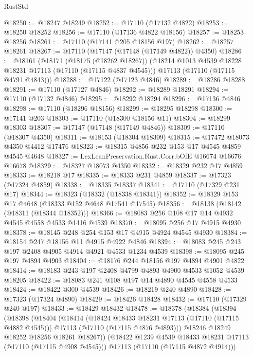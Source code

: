 \begin{lexlean}{RustStd}
\begin{coremodule}
@18250 := @18247 @18249
@18252 := @17110 (@17132 @4822)
@18253 := @18250 @18252
@18256 := @17110 (@17136 @4822 @18156)
@18257 := @18253 @18256
@18261 := @17110 (@17141 @205 @18156 @197)
@18262 := @18257 @18261
@18267 := @17110 (@17147 (@17148 (@17149 @4822)) @4350)
@18286 := @18161
    (@18171
      (@18175 (@18262 @18267))
      (@18214 @1013 @4539 @18228 @18231 @17113 (@17110 (@17115 @4837 @4545)))
      @17113
      (@17110 (@17115 @4791 @4843)))
@18288 := @17122 (@17123 @4846)
@18289 := @18286 @18288
@18291 := @17110 (@17127 @4846)
@18292 := @18289 @18291
@18294 := @17110 (@17132 @4846)
@18295 := @18292 @18294
@18296 := @17136 @4846
@18298 := @17110 (@18296 @18156)
@18299 := @18295 @18298
@18300 := @17141 @203
@18303 := @17110 (@18300 @18156 @11)
@18304 := @18299 @18303
@18307 := @17147 (@17148 (@17149 @4846))
@18309 := @17110 (@18307 @4350)
@18311 := @18153 (@18304 @18309)
@18315 := @17472 @18073 @4350 @4412 @17476
@18323 := @18315 @4856 @232 @153 @17 @4545 @4859 @4545 @4648
@18327 := LexLeanPreservation.Rust.Corr.bOfE @16674 @16676 @16678
@18329 := @18327 @18073 @4350
@18332 := @18329 @232 @17 @4859
@18333 := @18218 @17
@18335 := @18333 @231 @4859
@18337 := @17323 (@17324 @4859)
@18338 := @18335 @18337
@18341 := @17110 (@17329 @231 @17)
@18344 := @18323 (@18332 (@18338 @18341))
@18352 := @18329 @153 @17 @4648 (@18333 @152 @4648 @17541 @17545)
@18356 := @18138 (@18142 (@18311 (@18344 @18352)))
@18366 := @18083 @256 @108 @17 @14 @4932 @4545 @4558 @4533 @1416 @4539
@18370 := @18095 @256 @17 @4915 @4930
@18378 := @18145 @248 @254 @153 @17 @4915 @4924 @4545 @4930
@18384 := @18154 @247 @18156 @11 @4915 @4922 @4846
@18394 := @18083 @245 @243 @197 @2408 @4905 @4914 @4921 @4533 @1234 @4539
@18398 := @18095 @245 @197 @4894 @4903
@18404 := @18176 @244 @18156 @197 @4894 @4901 @4822
@18414 := @18183 @243 @197 @2408 @4799 @4893 @4900 @4533 @1052 @4539 @18205
@18422 := @18083 @241 @108 @197 @14 @4890 @4545 @4558 @4533
@18424 := @18422 @300 @4539
@18426 := @18219 @240 @4890
@18428 := @17323 (@17324 @4890)
@18429 := @18426 @18428
@18432 := @17110 (@17329 @240 @197)
@18433 := @18429 @18432
@18478 := @18378
    (@18384
      (@18394
        (@18398
          (@18404
            (@18414
              (@18424 @18433 @18231 @17113 (@17110 (@17115 @4882 @4545)))
              @17113
              (@17110 (@17115 @4876 @4893)))
            @18246
            @18249
            @18252
            @18256
            @18261
            @18267))
        (@18422 @1239 @4539 @18433 @18231 @17113 (@17110 (@17115 @4908 @4545)))
        @17113
        (@17110 (@17115 @4872 @4914)))

\end{coremodule}
\end{lexlean}
